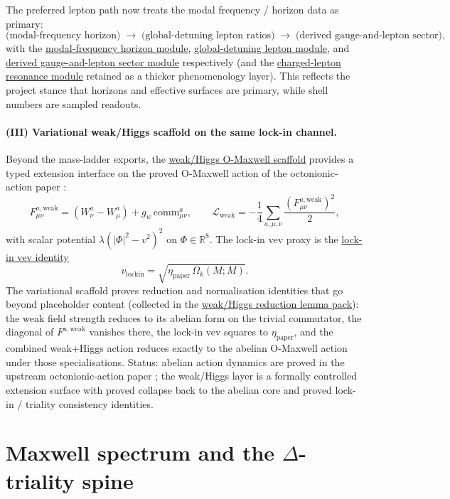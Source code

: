 \documentclass[11pt]{article}
\begin{document}
The preferred lepton path now treats the modal frequency /
horizon data as primary:
\[
  \text{(modal-frequency horizon)} \;\longrightarrow\;
  \text{(global-detuning lepton ratios)} \;\longrightarrow\;
  \text{(derived gauge-and-lepton sector)},
\]
with the
\hyperref[lean:modal-horizon]{modal-frequency horizon module},
\hyperref[lean:lepton-global-detuning]{global-detuning lepton
module}, and
\hyperref[lean:gauge-lepton]{derived gauge-and-lepton sector
module} respectively (and the
\hyperref[lean:lepton-resonance]{charged-lepton resonance
module} retained as a thicker phenomenology layer). This
reflects the project stance that horizons and effective
surfaces are primary, while shell numbers are sampled readouts.

\paragraph{(III) Variational weak/Higgs scaffold on the same lock-in channel.}
Beyond the mass-ladder exports, the
\hyperref[lean:weak-higgs]{weak/Higgs O-Maxwell scaffold}
provides a typed extension interface on the proved O-Maxwell
action of the octonionic-action paper
\cite{hqiv-oct-action-paper}:
\[
  F^{a,\mathrm{weak}}_{\mu\nu}
  =
  (W^a_\nu-W^a_\mu)+g_w\,\mathrm{comm}^a_{\mu\nu},
  \qquad
  \mathcal{L}_{\mathrm{weak}}
  =-\frac14\sum_{a,\mu,\nu}\frac{(F^{a,\mathrm{weak}}_{\mu\nu})^2}{2},
\]
with scalar potential $\lambda(|\Phi|^2-v^2)^2$ on
$\Phi\in\mathbb{R}^8$. The lock-in vev proxy is the
\hyperref[lean:lockin-vev]{lock-in vev identity}
\[
  v_{\mathrm{lockin}}=\sqrt{\eta_{\mathrm{paper}}\,\Omega_k(M;M)}.
\]
The variational scaffold proves reduction and normalisation
identities that go beyond placeholder content (collected in the
\hyperref[lean:weak-higgs-reductions]{weak/Higgs reduction lemma
pack}): the weak field strength reduces to its abelian form on
the trivial commutator, the diagonal of $F^{a,\mathrm{weak}}$
vanishes there, the lock-in vev squares to
$\eta_{\mathrm{paper}}$, and the combined weak+Higgs action
reduces exactly to the abelian O-Maxwell action under those
specialisations. Status: abelian action dynamics are proved in
the upstream octonionic-action paper
\cite{hqiv-oct-action-paper}; the weak/Higgs layer is a formally
controlled extension surface with proved collapse back to the
abelian core and proved lock-in / triality consistency
identities.

\section{Maxwell spectrum and the \texorpdfstring{$\Delta$}{Delta}-triality spine}
\label{sec:maxwell-delta-triality}
\end{document}
